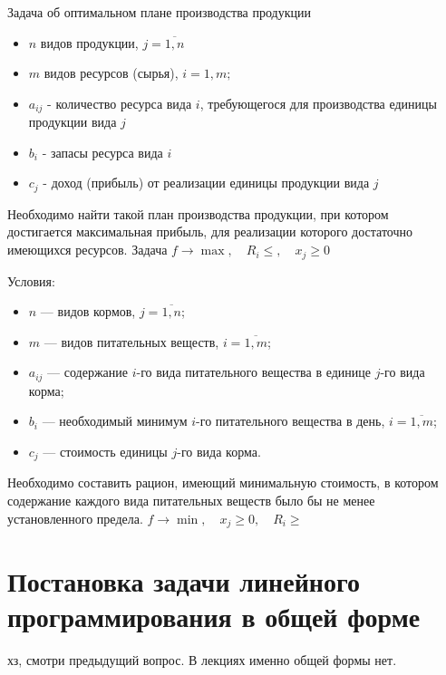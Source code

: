 \documentclass[17pt]{extarticle}
\begin{document}
\begin{definition}
    Задача об оптимальном плане производства продукции
    \begin{itemize}
        \item $n$ видов продукции, $j = \overline{1, n}$
        \item $m$ видов ресурсов (сырья), $i = 1, m;$
        \item $a_{ij}$ - количество ресурса вида $i$, требующегося для производства единицы продукции вида $j$
        \item $b_i$ - запасы ресурса вида $i$
        \item $c_j$ - доход (прибыль) от реализации единицы продукции вида $j$
    \end{itemize}
    Необходимо найти такой план производства продукции, при котором \\ достигается максимальная прибыль,
    для реализации которого достаточно имеющихся ресурсов. Задача $f \rightarrow \max, \quad R_i \leq, \quad x_j \geq 0$
\end{definition}


\begin{definition}
    Условия:
    \begin{itemize}
        \item \( n \) — видов кормов, \( j =\overline{1, n} \);
        \item \( m \) — видов питательных веществ, \( i =\overline{1, m} \);
        \item \( a_{ij} \) — содержание \( i \)-го вида питательного вещества в единице \( j \)-го вида корма;
        \item \( b_i \) — необходимый минимум \( i \)-го питательного вещества в день, \( i=\overline{1,m} \);
        \item \( c_j \) — стоимость единицы \( j \)-го вида корма.
    \end{itemize}

    Необходимо составить рацион, имеющий минимальную стоимость,
    в котором содержание каждого вида питательных веществ было бы не менее установленного предела.
    $f \rightarrow \min, \quad x_j \geq 0, \quad R_i \geq$
\end{definition}




\section{Постановка задачи линейного программирования в общей форме}
хз, смотри предыдущий вопрос. В лекциях именно общей формы нет.
\end{document}
